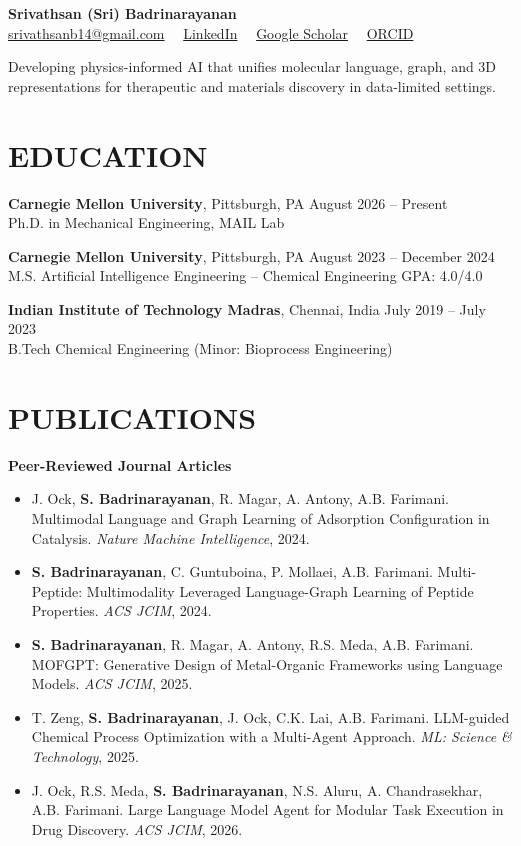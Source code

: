 \documentclass[letterpaper,10pt]{article}
\begin{document}
\begin{center}
\textbf{\large Srivathsan (Sri) Badrinarayanan}\\[2pt]
\href{mailto:srivathsanb14@gmail.com}{srivathsanb14@gmail.com} \, \textbullet \,
\href{https://www.linkedin.com/in/srivathsan-badrinarayanan}{LinkedIn} \, \textbullet \,
\href{https://scholar.google.com/citations?user=0rwC4GQAAAAJ&hl=en&oi=ao}{Google Scholar} \, \textbullet \,
\href{https://orcid.org/0009-0004-6517-3145}{ORCID}
\end{center}

\vspace{0.4em}
\noindent
Developing physics-informed AI that unifies molecular language, graph, and 3D representations for therapeutic and materials discovery in data-limited settings.

\section*{EDUCATION}
\noindent
\textbf{Carnegie Mellon University}, Pittsburgh, PA \hfill August 2026 -- Present\\
Ph.D. in Mechanical Engineering, MAIL Lab

\noindent
\textbf{Carnegie Mellon University}, Pittsburgh, PA \hfill August 2023 -- December 2024\\
M.S. Artificial Intelligence Engineering -- Chemical Engineering \hfill GPA: 4.0/4.0

\noindent
\textbf{Indian Institute of Technology Madras}, Chennai, India \hfill July 2019 -- July 2023\\
B.Tech Chemical Engineering (Minor: Bioprocess Engineering)

\section*{PUBLICATIONS}
\noindent\textbf{Peer-Reviewed Journal Articles}
\begin{itemize}
    \item J. Ock, \textbf{S. Badrinarayanan}, R. Magar, A. Antony, A.B. Farimani. Multimodal Language and Graph Learning of Adsorption Configuration in Catalysis. \textit{Nature Machine Intelligence}, 2024.
    \item \textbf{S. Badrinarayanan}, C. Guntuboina, P. Mollaei, A.B. Farimani. Multi-Peptide: Multimodality Leveraged Language-Graph Learning of Peptide Properties. \textit{ACS JCIM}, 2024.
    \item \textbf{S. Badrinarayanan}, R. Magar, A. Antony, R.S. Meda, A.B. Farimani. MOFGPT: Generative Design of Metal-Organic Frameworks using Language Models. \textit{ACS JCIM}, 2025.
    \item T. Zeng, \textbf{S. Badrinarayanan}, J. Ock, C.K. Lai, A.B. Farimani. LLM-guided Chemical Process Optimization with a Multi-Agent Approach. \textit{ML: Science \& Technology}, 2025.
    \item J. Ock, R.S. Meda, \textbf{S. Badrinarayanan}, N.S. Aluru, A. Chandrasekhar, A.B. Farimani. Large Language Model Agent for Modular Task Execution in Drug Discovery. \textit{ACS JCIM}, 2026.
\end{itemize}
\end{document}
